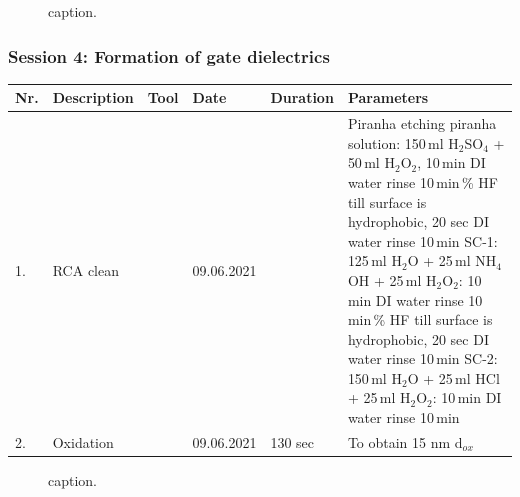\documentclass[12pt, a4paper, landscape]{article}
\begin{document}
\vspace{-0.5cm}   
\begin{figure}[H]
	\centering
  \caption{caption.}
\end{figure}

\newpage
\subsubsection*{Session 4: Formation of gate dielectrics}     
\vspace{-0.5cm}   
\begin{table}[H]
\footnotesize
\begin{tabular}{| p{0.4cm}| p{4.0cm}| p{3.0cm}|p{2.0cm}| p{2.0cm}|p{13.5cm}|}
\hline
\textbf{Nr.}&\textbf{Description} &\textbf{Tool}& \textbf{Date}  &\textbf{Duration} & \textbf{Parameters}\\ \hline\hline

1. &RCA clean&  &09.06.2021 & & Piranha etching\newline 
piranha solution: 150\,ml H$_\text{2}$SO$_\text{4}$ + 50\,ml H$_\text{2}$O$_\text{2}$, 10\,min\newline
DI water rinse 10\,min\newline
1\,\% HF till surface is hydrophobic, 20 sec\newline
DI water rinse 10\,min\newline
SC-1: 125\,ml H$_\text{2}$O + 25\,ml NH$_\text{4}$OH + 25\,ml H$_\text{2}$O$_\text{2}$: 10\,min \newline
DI water rinse 10\,min\newline
1\,\% HF till surface is hydrophobic, 20 sec\newline
DI water rinse 10\,min\newline
SC-2: 150\,ml H$_\text{2}$O + 25\,ml HCl + 25\,ml H$_\text{2}$O$_\text{2}$: 10\,min\newline
DI water rinse 10\,min
\\\hline

2. & Oxidation & &  09.06.2021&    130 sec & To obtain 15 nm d$_{ox}$\\\hline
\end{tabular}
\end{table} 

\vspace{-0.5cm}   
\begin{figure}[H]
	\centering
  \caption{caption.}
\end{figure}
\end{document}
